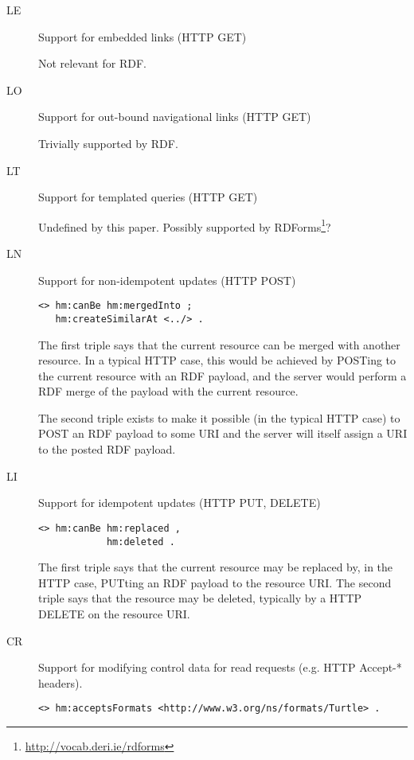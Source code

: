 \documentclass{llncs}
\begin{document}
\begin{description}
\item[LE] Support for embedded links (HTTP GET)

Not relevant for RDF.

\item[LO] Support for out-bound navigational links (HTTP GET)

Trivially supported by RDF.

\item[LT] Support for templated queries (HTTP GET)

Undefined by this paper. Possibly supported by RDForms\footnote{\url{http://vocab.deri.ie/rdforms}}?

\item[LN] Support for non-idempotent updates (HTTP POST) 

\begin{verbatim}
<> hm:canBe hm:mergedInto ;
   hm:createSimilarAt <../> .
\end{verbatim}

The first triple says that the current resource can be merged with
another resource. In a typical HTTP case, this would be achieved by
POSTing to the current resource with an RDF payload, and the server
would perform a RDF merge of the payload with the current resource.

The second triple exists to make it possible (in the typical HTTP
case) to POST an RDF payload to some URI and the server will itself
assign a URI to the posted RDF payload. 


\item[LI] Support for idempotent updates (HTTP PUT, DELETE) 

\begin{verbatim}
<> hm:canBe hm:replaced ,
            hm:deleted .
\end{verbatim}

The first triple says that the current resource may be replaced by, in
the HTTP case, PUTting an RDF payload to the resource URI. The second
triple says that the resource may be deleted, typically by a HTTP
DELETE on the resource URI.


\item[CR] Support for modifying control data for read requests
  (e.g. HTTP Accept-* headers).

\begin{verbatim}
<> hm:acceptsFormats <http://www.w3.org/ns/formats/Turtle> .
\end{verbatim}


\end{description}
\end{document}
